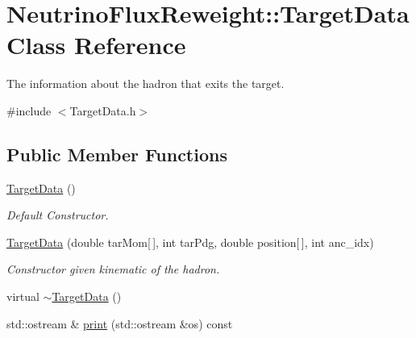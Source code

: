 \hypertarget{class_neutrino_flux_reweight_1_1_target_data}{\section{Neutrino\-Flux\-Reweight\-:\-:Target\-Data Class Reference}
\label{class_neutrino_flux_reweight_1_1_target_data}
}


The information about the hadron that exits the target.  




{\ttfamily \#include $<$Target\-Data.\-h$>$}

\subsection*{Public Member Functions}
\begin{DoxyCompactItemize}
\item 
\hyperlink{class_neutrino_flux_reweight_1_1_target_data_ac59ce1b069929e65d802bccc4bc1b032}{Target\-Data} ()
\begin{DoxyCompactList}\small\item\em Default Constructor. \end{DoxyCompactList}\item 
\hyperlink{class_neutrino_flux_reweight_1_1_target_data_aa46758af6f223c7a32e4fb2c8c1df468}{Target\-Data} (double tar\-Mom\mbox{[}$\,$\mbox{]}, int tar\-Pdg, double position\mbox{[}$\,$\mbox{]}, int anc\-\_\-idx)
\begin{DoxyCompactList}\small\item\em Constructor given kinematic of the hadron. \end{DoxyCompactList}\item 
virtual \hyperlink{class_neutrino_flux_reweight_1_1_target_data_ad2fd58192b4aa707a3d58ae7575e46ed}{$\sim$\-Target\-Data} ()
\item 
std\-::ostream \& \hyperlink{class_neutrino_flux_reweight_1_1_target_data_a3bd231576e6a92d78a95bef604878e5b}{print} (std\-::ostream \&os) const 
\end{DoxyCompactItemize}
